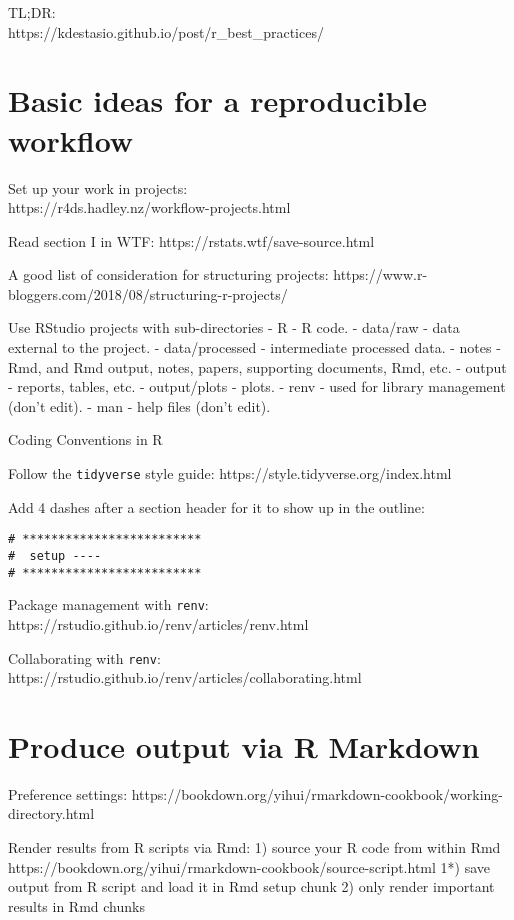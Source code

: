 \documentclass[
  letterpaper,
  DIV=11,
  numbers=noendperiod]{scrreport}
\begin{document}
TL;DR:\\
https://kdestasio.github.io/post/r\_best\_practices/

\hypertarget{basic-ideas-for-a-reproducible-workflow}{%
\section{Basic ideas for a reproducible
workflow}\label{basic-ideas-for-a-reproducible-workflow}}

Set up your work in projects:\\
https://r4ds.hadley.nz/workflow-projects.html

Read section I in WTF: https://rstats.wtf/save-source.html

A good list of consideration for structuring projects:
https://www.r-bloggers.com/2018/08/structuring-r-projects/

Use RStudio projects with sub-directories - R - R code. - data/raw -
data external to the project. - data/processed - intermediate processed
data. - notes - Rmd, and Rmd output, notes, papers, supporting
documents, Rmd, etc. - output - reports, tables, etc. - output/plots -
plots. - renv - used for library management (don't edit). - man - help
files (don't edit).

Coding Conventions in R

Follow the \texttt{tidyverse} style guide:
https://style.tidyverse.org/index.html

Add 4 dashes after a section header for it to show up in the outline:

\begin{verbatim}
# *************************
#  setup ----
# *************************
\end{verbatim}

Package management with \texttt{renv}:
https://rstudio.github.io/renv/articles/renv.html

Collaborating with \texttt{renv}:
https://rstudio.github.io/renv/articles/collaborating.html

\hypertarget{produce-output-via-r-markdown}{%
\section{Produce output via R
Markdown}\label{produce-output-via-r-markdown}}

Preference settings:
https://bookdown.org/yihui/rmarkdown-cookbook/working-directory.html

Render results from R scripts via Rmd: 1) source your R code from within
Rmd https://bookdown.org/yihui/rmarkdown-cookbook/source-script.html 1*)
save output from R script and load it in Rmd setup chunk 2) only render
important results in Rmd chunks
\end{document}
